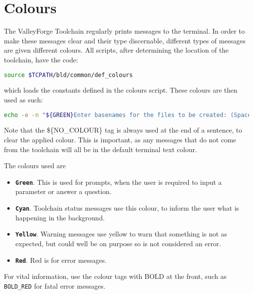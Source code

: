 \documentclass[a4paper, oneside, 11pt, titlepage, onecolumn, openright]{report}
\begin{document}
\section{Colours}
			\label{s:Colours}
			The ValleyForge Toolchain regularly prints messages to the terminal. In order to make these messages clear and their type discernable, different types of messages are given different colours. All scripts, after determining the location of the toolchain, have the code:

\begin{lstlisting}[frame=trBL, breaklines=true, language = bash]
source $TCPATH/bld/common/def_colours

\end{lstlisting}			
			
which loads the constants defined in the colours script. These colours are then used as such:

\begin{lstlisting}[frame=trBL, breaklines=true, language = bash]
echo -e -n "${GREEN}Enter basenames for the files to be created: (Space separated) ${NO_COLOUR}"
\end{lstlisting}					
			
			Note that the \$\{NO\_COLOUR\} tag is always used at the end of a sentence, to clear the applied colour. This is important, as any messages that do not come from the toolchain will all be in the default terminal text colour.
			
			The colours used are
			
\begin{itemize}

\item \textbf{\texttt{Green}}. This is used for prompts, when the user is required to input a parameter or answer a question.

\item \textbf{\texttt{Cyan}}. Toolchain status messages use this colour, to inform the user what is happening in the background.

\item \textbf{\texttt{Yellow}}. Warning messages use yellow to warn that something is not as expected, but could well be on purpose so is not considered an error.

\item \textbf{\texttt{Red}}. Red is for error messages.

\end{itemize}

			For vital information, use the colour tags with BOLD at the front, such as \texttt{BOLD\_RED} for fatal error messages.
\end{document}
